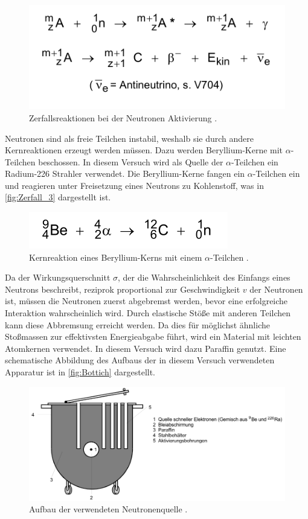\begin{figure}
    \centering
    \includegraphics[width = .5\textwidth]{content/Zerfall_2.png}
    \caption{Zerfallsreaktionen bei der Neutronen Aktivierung \cite{v702}.}
    \label{fig:Zerfall_2}
\end{figure}

Neutronen sind als freie Teilchen instabil, weshalb sie durch andere Kernreaktionen erzeugt werden müssen. Dazu werden Beryllium-Kerne mit $\alpha$-Teilchen beschossen.
In diesem Versuch wird als Quelle der $\alpha$-Teilchen ein Radium-226 Strahler verwendet. 
Die Beryllium-Kerne fangen ein $\alpha$-Teilchen ein und reagieren unter Freisetzung eines Neutrons zu Kohlenstoff, was in \autoref{fig:Zerfall_3} dargestellt ist.

\begin{figure}
    \centering
    \includegraphics[width = .3\textwidth]{content/Zerfall_3.png}
    \caption{Kernreaktion eines Beryllium-Kerns mit einem $\alpha$-Teilchen \cite{v702}.}
    \label{fig:Zerfall_3}
\end{figure}

Da der Wirkungsquerschnitt $\sigma$, der die Wahrscheinlichkeit des Einfangs eines Neutrons beschreibt, reziprok proportional zur Geschwindigkeit $v$ der Neutronen ist, 
müssen die Neutronen zuerst abgebremst werden, bevor eine erfolgreiche Interaktion wahrscheinlich wird. Durch elastische Stöße mit anderen Teilchen kann diese Abbremsung
erreicht werden. Da dies für möglichst ähnliche Stoßmassen zur effektivsten Energieabgabe führt, wird ein Material mit leichten Atomkernen verwendet. In diesem Versuch wird
dazu Paraffin genutzt. Eine schematische Abbildung des Aufbaus der in diesem Versuch verwendeten Apparatur ist in \autoref{fig:Bottich} dargestellt.

\begin{figure}
    \centering
    \includegraphics[width = .9\textwidth]{content/Bottich.png}
    \caption{Aufbau der verwendeten Neutronenquelle \cite{v702}.}
    \label{fig:Bottich}
\end{figure}

